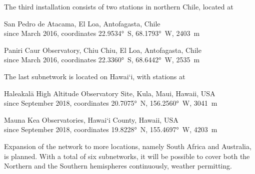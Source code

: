         The third installation consists of two stations in northern Chile, located at
        \begin{description}[leftmargin = 25mm]
            \item[SP]       San Pedro de Atacama, El Loa, Antofagasta, Chile\\
                            since March 2016, coordinates \ang{22.9534}~S, \ang{68.1793}~W, \SI{2403}{\metre}
            \item[PC]       Paniri Caur Observatory, Chiu Chiu, El Loa, Antofagasta, Chile\\
                            since March 2016, coordinates \ang{22.3360}~S, \ang{68.6442}~W, \SI{2535}{\metre}
        \end{description}

        The last subnetwork is located on Hawai`i, with stations at
        \begin{description}[leftmargin = 25mm]
            \item[HK]       Haleakalā High Altitude Observatory Site, Kula, Maui, Hawaii, USA\\
                            since September 2018, coordinates \ang{20.7075}~N, \ang{156.2560}~W, \SI{3041}{\metre}
            \item[MK]       Mauna Kea Observatories, Hawai`i County, Hawaii, USA\\
                            since September 2018, coordinates \ang{19.8228}~N, \ang{155.4697}~W, \SI{4203}{\metre}
        \end{description}


        Expansion of the network to more locations, namely South Africa and Australia, is planned.
        With a total of six subnetworks, it will be possible to cover both the Northern and
        the Southern hemispheres continuously, weather permitting.
